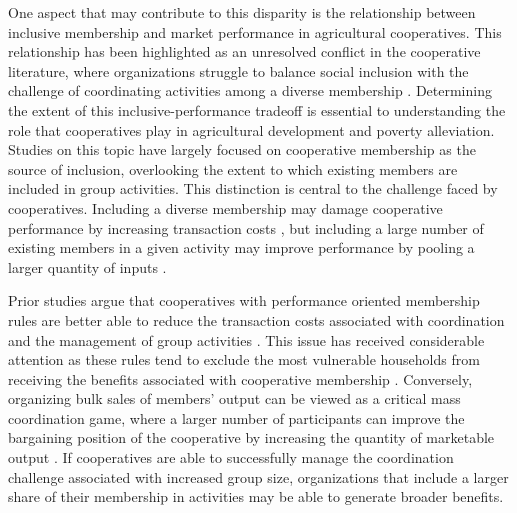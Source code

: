 \documentclass[11pt]{article}
\begin{document}
One aspect that may contribute to this disparity is the relationship between inclusive membership and market performance in agricultural cooperatives. This relationship has been highlighted as an unresolved conflict in the cooperative literature, where organizations struggle to balance social inclusion with the challenge of coordinating activities among a diverse membership \citep{bernard_reaching_2009,world_bank_world_2008}. Determining the extent of this inclusive-performance tradeoff is essential to understanding the role that cooperatives play in agricultural development and poverty alleviation. Studies on this topic have largely focused on cooperative membership as the source of inclusion, overlooking the extent to which existing members are included in group activities. This distinction is central to the challenge faced by cooperatives. Including a diverse membership may damage cooperative performance by increasing transaction costs \citep{world_bank_world_2008}, but including a large number of existing members in a given activity may improve performance by pooling a larger quantity of inputs \citep{aflagah_cheap_2019}. 

Prior studies argue that cooperatives with performance oriented membership rules are better able to reduce the transaction costs associated with coordination and the management of group activities \citep{bernard_reaching_2009}. This issue has received considerable attention as these rules tend to exclude the most vulnerable households from receiving the benefits associated with cooperative membership \citep{world_bank_world_2008}. Conversely, organizing bulk sales of members' output can be viewed as a critical mass coordination game, where a larger number of participants can improve the bargaining position of the cooperative by increasing the quantity of marketable output \citep{aflagah_cheap_2019}. If cooperatives are able to successfully manage the coordination challenge associated with increased group size, organizations that include a larger share of their membership in activities may be able to generate broader benefits. %
\end{document}
